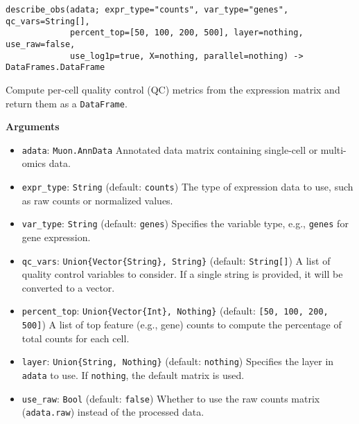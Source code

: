 \documentclass[oneside]{memoir}
\begin{document}
\begin{adjustwidth}{2em}{0pt}


\begin{verbatim}
describe_obs(adata; expr_type="counts", var_type="genes", qc_vars=String[], 
             percent_top=[50, 100, 200, 500], layer=nothing, use_raw=false, 
             use_log1p=true, X=nothing, parallel=nothing) -> DataFrames.DataFrame
\end{verbatim}

Compute per-cell quality control (QC) metrics from the expression matrix and return them as a \texttt{DataFrame}.

\textbf{Arguments}

\begin{itemize}
\item \texttt{adata}: \texttt{Muon.AnnData}   Annotated data matrix containing single-cell or multi-omics data.


\item \texttt{expr\_type}: \texttt{String} (default: \texttt{{\textquotedbl}counts{\textquotedbl}})   The type of expression data to use, such as raw counts or normalized values.


\item \texttt{var\_type}: \texttt{String} (default: \texttt{{\textquotedbl}genes{\textquotedbl}})   Specifies the variable type, e.g., \texttt{{\textquotedbl}genes{\textquotedbl}} for gene expression.


\item \texttt{qc\_vars}: \texttt{Union\{Vector\{String\}, String\}} (default: \texttt{String[]})   A list of quality control variables to consider. If a single string is provided, it will be converted to a vector.


\item \texttt{percent\_top}: \texttt{Union\{Vector\{Int\}, Nothing\}} (default: \texttt{[50, 100, 200, 500]})   A list of top feature (e.g., gene) counts to compute the percentage of total counts for each cell.


\item \texttt{layer}: \texttt{Union\{String, Nothing\}} (default: \texttt{nothing})   Specifies the layer in \texttt{adata} to use. If \texttt{nothing}, the default matrix is used.


\item \texttt{use\_raw}: \texttt{Bool} (default: \texttt{false})   Whether to use the raw counts matrix (\texttt{adata.raw}) instead of the processed data.



\end{itemize}
\end{adjustwidth}
\end{document}
